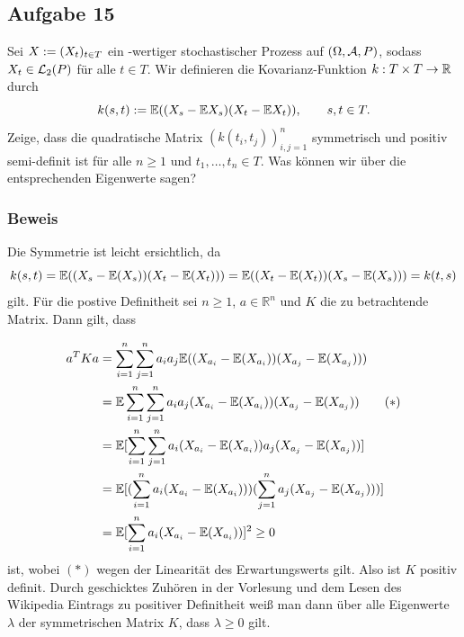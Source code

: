 \documentclass[12pt]{scrartcl}
\begin{document}
\ausruecken

\subsection*{Aufgabe 15}

Sei $X:=(X_t)_{t\in T}$ ein \R-wertiger stochastischer Prozess auf $(\Omega,\mathcal{A},P)$, sodass $X_t\in\mathcal{L}_2(P)$ für alle $t\in T$. Wir definieren die Kovarianz-Funktion $k:T\times T \rightarrow \mathbb{R}$ durch
$$k(s,t):=\mathbb{E}((X_s-\mathbb{E} X_s)(X_t-\mathbb{E} X_t)),\qquad s,t\in T.$$
Zeige, dass die quadratische Matrix $(k(t_i,t_j))_{i,j=1}^n$ symmetrisch und positiv semi-definit ist für alle $n\ge 1$ und $t_1,\dots,t_n\in T$. Was können wir über die entsprechenden Eigenwerte sagen?

\subsubsection*{Beweis}
\einruecken

Die Symmetrie ist leicht ersichtlich, da 
$$k(s,t) = \mathbb{E}((X_s -\mathbb{E}(X_s))(X_t -\mathbb{E}(X_t))) = \mathbb{E}((X_t -\mathbb{E}(X_t))(X_s -\mathbb{E}(X_s))) = k(t,s)$$ 
gilt. Für die postive Definitheit sei $n \geq 1 $, $a \in \mathbb{R}^n $ und $K$ die zu betrachtende Matrix. Dann gilt, dass

\begin{align*}
	a^T K a &= \sum_{i=1}^n \sum_{j=1}^n a_i a_j \mathbb{E}((X_{a_i} -\mathbb{E}(X_{a_i}))(X_{a_j} - \mathbb{E}(X_{a_j})))			\\
			&= \mathbb{E} \sum_{i=1}^n \sum_{j=1}^n a_i a_j (X_{a_i} -\mathbb{E}(X_{a_i}))(X_{a_j} - \mathbb{E}(X_{a_j})) \tag{$\ast$}			\\
			&= \mathbb{E} [\sum_{i=1}^n \sum_{j=1}^n a_i (X_{a_i} - \mathbb{E}(X_{a_i})) a_j(X_{a_j} - \mathbb{E}(X_{a_j}))]		\\
			&= \mathbb{E} [(\sum_{i=1}^na_i (X_{a_i} - \mathbb{E}(X_{a_i}))) (\sum_{j=1}^n a_j(X_{a_j} - \mathbb{E}(X_{a_j})) )] 	\\
			&= \mathbb{E} [\sum_{i=1}^na_i (X_{a_i} - \mathbb{E}(X_{a_i}))]^2 \geq 0
\end{align*}
ist, wobei $(\ast)$ wegen der Linearität des Erwartungswerts gilt. Also ist $K$ positiv definit. Durch geschicktes Zuhören in der Vorlesung und dem Lesen des Wikipedia Eintrags zu positiver Definitheit weiß 
man dann über alle Eigenwerte $\lambda$ der symmetrischen Matrix $K$, dass $\lambda \geq 0$ gilt.
\ausruecken
	
\end{document}
